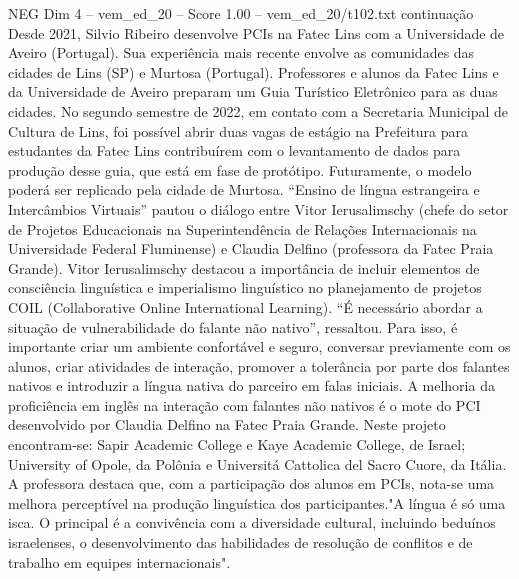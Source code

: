 \begin{textsample}{NEG Dim 4 – vem\_ed\_20 – Score 1.00 – vem\_ed\_20/t102.txt}  \label{ex:f4_neg_006}
continuação Desde 2021, Silvio Ribeiro desenvolve PCIs na Fatec Lins com a Universidade de Aveiro (Portugal).
Sua experiência mais recente envolve as comunidades das cidades de Lins (SP) e Murtosa (Portugal).
Professores e alunos da Fatec Lins e da Universidade de Aveiro preparam um Guia Turístico Eletrônico para as duas cidades.
No segundo semestre de 2022, em contato com a Secretaria Municipal de Cultura de Lins, foi possível abrir duas vagas de estágio na Prefeitura para estudantes da Fatec Lins contribuírem com o levantamento de dados para produção desse guia, que está em fase de protótipo.
Futuramente, o modelo poderá ser replicado pela cidade de Murtosa. “Ensino de língua estrangeira e Intercâmbios Virtuais” pautou o diálogo entre Vitor Ierusalimschy (chefe do setor de Projetos Educacionais na Superintendência de Relações Internacionais na Universidade Federal Fluminense) e Claudia Delfino (professora da Fatec Praia Grande).
Vitor Ierusalimschy destacou a importância de incluir elementos de consciência linguística e imperialismo linguístico no planejamento de projetos COIL (Collaborative Online International Learning). “É necessário abordar a situação de vulnerabilidade do falante não nativo”, ressaltou.
Para isso, é importante criar um ambiente confortável e seguro, conversar previamente com os alunos, criar atividades de interação, promover a tolerância por parte dos falantes nativos e introduzir a língua nativa do parceiro em falas iniciais.
A melhoria da proficiência em inglês na interação com falantes não nativos é o mote do PCI desenvolvido por Claudia Delfino na Fatec Praia Grande.
Neste projeto encontram-se: Sapir Academic College e Kaye Academic College, de Israel; University of Opole, da Polônia e Universitá Cattolica del Sacro Cuore, da Itália.
A professora destaca que, com a participação dos alunos em PCIs, nota-se uma melhora perceptível na produção linguística dos participantes."A língua é só uma isca.
O principal é a convivência com a diversidade cultural, incluindo beduínos israelenses, o desenvolvimento das habilidades de resolução de conflitos e de trabalho em equipes internacionais".

\end{textsample}
